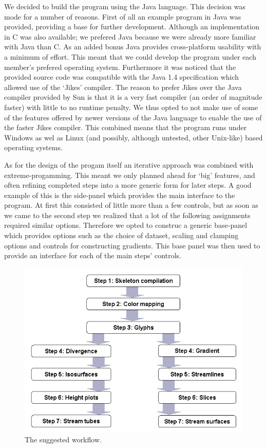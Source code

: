 \documentclass[a4paper,11pt,twoside]{report}
\begin{document}
	We decided to build the program using the Java language. This decision was mode for a number of reasons. First of all an example program in Java was provided, providing a base for further development. Although an implementation in C was also available; we prefered Java because we were already more familiar with Java than C. As an added bonus Java provides cross-platform usability with a minimum of effort. This meant that we could develop the program under each member's prefered operating system. Furthermore it was noticed that the provided source code was compatible with the Java 1.4 specification which allowed use of the `Jikes' compiler. The reason to prefer Jikes over the Java compiler provided by Sun is that it is a very fast compiler (an order of magnitude faster) with little to no runtime penalty. We thus opted to not make use of some of the features offered by newer versions of the Java language to enable the use of the faster Jikes compiler. This combined means that the program runs under Windows as wel as Linux (and possibly, although untested, other Unix-like) based operating systems.

	As for the design of the progam itself an iterative approach was combined with extreme-progamming. This meant we only planned ahead for `big' features, and often refining completed steps into a more generic form for later steps. A good example of this is the side-panel which provides the main interface to the program. At first this consisted of little more than a few controls, but as soon as we came to the second step we realized that a lot of the following assignments required similar options. Therefore we opted to construc a generic base-panel which provides options such as the choice of dataset, scaling and clamping options and controls for constructing gradients. This base panel was then used to provide an interface for each of the main steps' controls.

	\begin{figure}[h]
	\centering
	\includegraphics[scale=\imagescalefactor]{images/overview.png}
	\caption{The suggested workflow.}\label{fig:overview}
	\end{figure}
\end{document}
